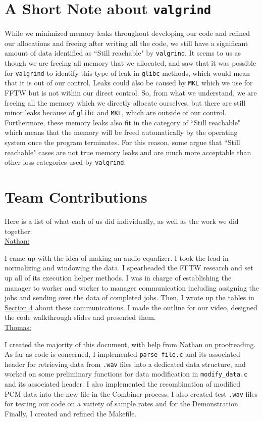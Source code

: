 \documentclass[11pt]{extarticle}
\begin{document}
\section{A Short Note about \texttt{valgrind}}\label{valgrind}

While we minimized memory leaks throughout developing our code and refined our allocations and freeing after writing all the code, we still have a significant amount of data identified as ``Still reachable" by \texttt{valgrind}. It seems to us as though we are freeing all memory that we allocated, and saw that it was possible for \texttt{valgrind} to identify this type of leak in \texttt{glibc} methods, which would mean that it is out of our control. Leaks could also be caused by \texttt{MKL} which we use for FFTW but is not within our direct control. So, from what we understand, we are freeing all the memory which we directly allocate ourselves, but there are still minor leaks because of \texttt{glibc} and \texttt{MKL}, which are outside of our control. Furthermore, these memory leaks also fit in the category of ``Still reachable" which means that the memory will be freed automatically by the operating system once the program terminates. For this reason, some argue that ``Still reachable" cases are not true memory leaks and are much more acceptable than other loss categories used by \texttt{valgrind}. 

\section{Team Contributions}\label{team}

Here is a list of what each of us did individually, as well as the work we did together:\\

\underline{Nathan:}

I came up with the idea of making an audio equalizer. I took the lead in normalizing and windowing the data. I spearheaded the FFTW research and set up all of its execution helper methods. I was in charge of establishing the manager to worker and worker to manager communication including assigning the jobs and sending over the data of completed jobs. Then, I wrote up the tables in \hyperref[comm]{Section 4} about these communications. I made the outline for our video, designed the code walkthrough slides and presented them. \\

\underline{Thomas:}


I created the majority of this document, with help from Nathan on proofreading. As far as code is concerned, I implemented \texttt{parse\_file.c} and its associated header for retrieving data from \texttt{.wav} files into a dedicated data structure, and worked on some preliminary functions for data modification in \texttt{modify\_data.c} and its associated header. I also implemented the recombination of modified PCM data into the new file in the Combiner process. I also created test \texttt{.wav} files for testing our code on a variety of sample rates and for the Demonstration. Finally, I created and refined the Makefile.\\
\end{document}

